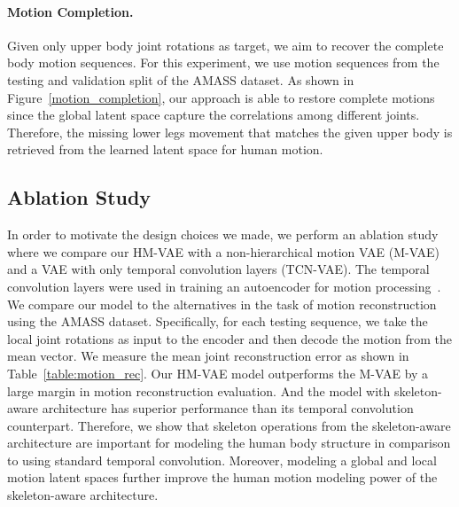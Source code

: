 \vspace{-4mm}
\paragraph{Motion Completion.}
Given only upper body joint rotations as target, we aim to recover the complete body motion sequences.
For this experiment, we use motion sequences from the testing and validation split of the AMASS dataset.
As shown in Figure~\ref{motion_completion}, our approach is able to restore complete motions since the global latent space capture the correlations among different joints.
Therefore, the missing lower legs movement that matches the given upper body is retrieved from the learned latent space for human motion.


\subsection{Ablation Study}
\vspace{-2mm}
In order to motivate the design choices we made, we perform an ablation study where we compare our HM-VAE with a non-hierarchical motion VAE (M-VAE) and a VAE with only temporal convolution layers (TCN-VAE). The temporal convolution layers were used in training an autoencoder for motion processing~\cite{holden2015learning,holden2016deep}.
We compare our model to the alternatives in the task of motion reconstruction using the AMASS dataset. 
Specifically, for each testing sequence, we take the local joint rotations as input to the encoder and then decode the motion from the mean vector.
We measure the mean joint reconstruction error as shown in Table~\ref{table:motion_rec}.
Our HM-VAE model outperforms the M-VAE by a large margin in motion reconstruction evaluation.
And the model with skeleton-aware architecture has superior performance than its temporal convolution counterpart.
Therefore, we show that skeleton operations from the skeleton-aware architecture are important for modeling the human body structure in comparison to using standard temporal convolution.
Moreover, modeling a global and local motion latent spaces further improve the human motion modeling power of the skeleton-aware architecture. 
\\

